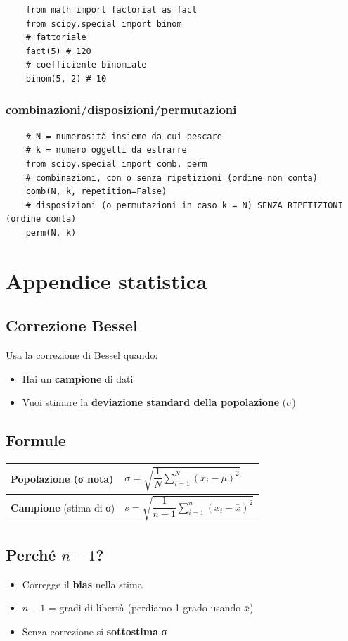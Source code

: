 \documentclass{article}
\begin{document}
\begin{lstlisting}
    from math import factorial as fact
    from scipy.special import binom
    # fattoriale
    fact(5) # 120
    # coefficiente binomiale
    binom(5, 2) # 10
\end{lstlisting}

\subsubsection*{combinazioni/disposizioni/permutazioni}

\begin{lstlisting}
    # N = numerosità insieme da cui pescare
    # k = numero oggetti da estrarre
    from scipy.special import comb, perm
    # combinazioni, con o senza ripetizioni (ordine non conta)
    comb(N, k, repetition=False)
    # disposizioni (o permutazioni in caso k = N) SENZA RIPETIZIONI (ordine conta)
    perm(N, k)
\end{lstlisting}

\section*{Appendice statistica}

\subsection*{Correzione Bessel}
Usa la correzione di Bessel quando:
\begin{itemize}
    \item Hai un \textbf{campione} di dati
    \item Vuoi stimare la \textbf{deviazione standard della popolazione} ($\sigma$)
\end{itemize}

\subsection*{Formule}
\begin{tabular}{|l|l|}
\hline
\textbf{Popolazione} (σ nota) & $\sigma = \sqrt{\dfrac{1}{N}\sum\limits_{i=1}^N (x_i - \mu)^2}$ \\
\hline
\textbf{Campione} (stima di σ) & $s = \sqrt{\dfrac{1}{n-1}\sum\limits_{i=1}^n (x_i - \bar{x})^2}$ \\
\hline
\end{tabular}

\subsection*{Perché $n-1$?}
\begin{itemize}
    \item Corregge il \textbf{bias} nella stima
    \item $n-1$ = gradi di libertà (perdiamo 1 grado usando $\bar{x}$)
    \item Senza correzione si \textbf{sottostima} σ
\end{itemize}
\end{document}

